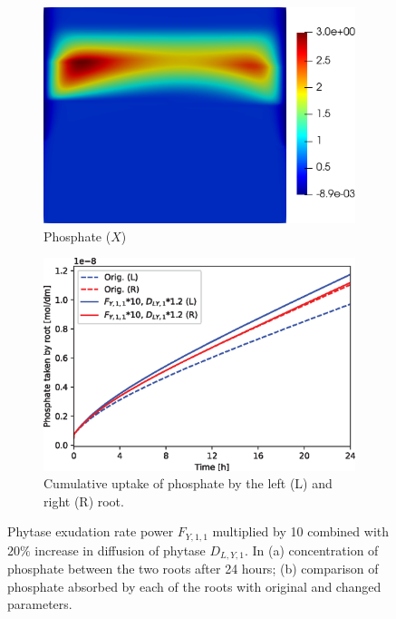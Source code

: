 \documentclass[11pt]{article}
\numberwithin{equation}{section}
\begin{document}
\begin{figure}[!htb]
\centering
\begin{subfigure}[t]{0.35\textwidth}
    \includegraphics[width=\textwidth]{Figures/X_Fy11times10Y1up20pc.png}
    \caption{Phosphate ($X$)}
\end{subfigure}
\hspace{1cm}
\begin{subfigure}[t]{0.4\textwidth}
    \includegraphics[width=\textwidth]{Figures/Fy11times10DY1up20pc.eps}
    \caption{Cumulative uptake of phosphate by the left (L) and right (R) root.}
\end{subfigure}

\caption{Phytase exudation rate power $F_{Y,1,1}$ multiplied by 10 combined with $20\%$ increase in diffusion of phytase $D_{L,Y,1}$. In (a) concentration of phosphate between the two roots after 24 hours; (b) comparison of phosphate absorbed by each of the roots with original and changed parameters.}
\end{figure}
\end{document}
